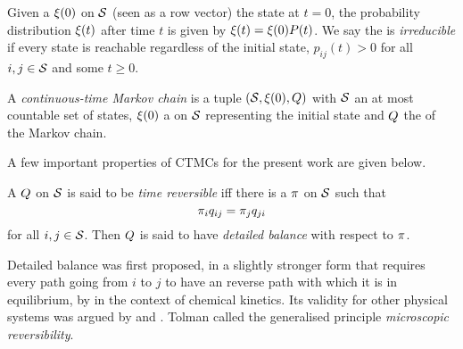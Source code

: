 Given a \pmf $\xi(0)$ on $\mathcal{S}$ (seen as a row vector)
the state at $t = 0$,
the probability distribution $\xi(t)$ after time $t$
is given by $\xi(t) = \xi(0) P(t)$.
We say the \qmatrix is \emph{irreducible}
if every state is reachable regardless of the initial state,
\ie $p_{ij}(t) > 0$ for all $i,j \in \mathcal{S}$
and some $t \geqslant 0$.

\begin{definition}[CTMC]%
  A \emph{continuous-time Markov chain} is a tuple
  $\left(\mathcal{S}, \xi(0), Q\right)$ with
  $\mathcal{S}$ an at most countable set of states,
  $\xi(0)$ a \pmf on $\mathcal{S}$
  representing the initial state and
  $Q$ the \qmatrix of the Markov chain.
\end{definition}

A few important properties of CTMCs
for the present work are given below.

\begin{definition}
  A \qmatrix $Q$ on $\mathcal{S}$
  is said to be \emph{time reversible} iff
  there is a \pmf $\pi$ on $\mathcal{S}$ such that
  \begin{equation}
    \label{eq:detailed-balance}
    \pi_i q_{ij} = \pi_j q_{ji}
  \end{equation}
  for all $i,j \in \mathcal{S}$.
  Then $Q$ is said to have \emph{detailed balance}
  with respect to $\pi$.
\end{definition}

Detailed balance was first proposed,
in a slightly stronger form
that requires every path going from $i$ to $j$
to have an reverse path with which it is in equilibrium,
by \citet{wegscheider} in the context of chemical kinetics.
Its validity for other physical systems was argued by
\citet{lewis} and \citet{tolman}.
Tolman called the generalised principle
\emph{microscopic reversibility}.

